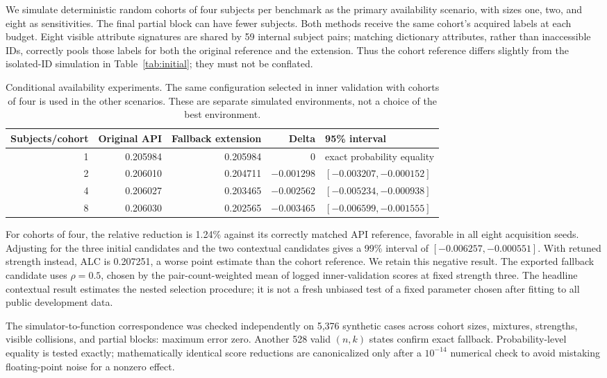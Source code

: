 \documentclass{article}
\begin{document}
We simulate deterministic random cohorts of four subjects per benchmark as
the primary availability scenario, with sizes one, two, and eight as
sensitivities. The final partial block can have fewer subjects. Both methods
receive the same cohort's acquired labels at each budget. Eight visible
attribute signatures are shared by 59 internal subject pairs; matching
dictionary attributes, rather than inaccessible IDs, correctly pools those
labels for both the original reference and the extension. Thus the cohort
reference differs slightly from the isolated-ID simulation in
Table~\ref{tab:initial}; they must not be conflated.

\begin{table}[t]
\centering\small
\caption{Conditional availability experiments. The same configuration selected
in inner validation with cohorts of four is used in the other scenarios.
These are separate simulated environments, not a choice of the best environment.}
\label{tab:context}
\begin{tabular}{rrrrl}
\toprule
Subjects/cohort & Original API & Fallback extension & Delta & 95\% interval\\
\midrule
1 & 0.205984 & 0.205984 & $0$ & exact probability equality\\
2 & 0.206010 & 0.204711 & $-0.001298$ & $[-0.003207,-0.000152]$\\
4 & 0.206027 & 0.203465 & $-0.002562$ & $[-0.005234,-0.000938]$\\
8 & 0.206030 & 0.202565 & $-0.003465$ & $[-0.006599,-0.001555]$\\
\bottomrule
\end{tabular}
\end{table}

For cohorts of four, the relative reduction is 1.24\% against its correctly
matched API reference, favorable in all eight acquisition seeds. Adjusting
for the three initial candidates and the two contextual candidates gives
a 99\% interval of $[-0.006257,-0.000551]$. With retuned strength instead,
ALC is 0.207251, a worse point estimate than the cohort reference. We retain
this negative result. The exported fallback candidate uses $\rho=0.5$,
chosen by the pair-count-weighted mean of logged inner-validation scores
at fixed strength three. The headline contextual result estimates the
nested selection procedure; it is not a fresh unbiased test of a fixed
parameter chosen after fitting to all public development data.

The simulator-to-function correspondence was checked independently on
5,376 synthetic cases across cohort sizes, mixtures, strengths, visible
collisions, and partial blocks: maximum error zero. Another 528 valid
$(n,k)$ states confirm exact fallback. Probability-level equality is tested
exactly; mathematically identical score reductions are canonicalized only
after a $10^{-14}$ numerical check to avoid mistaking floating-point noise
for a nonzero effect.
\end{document}
